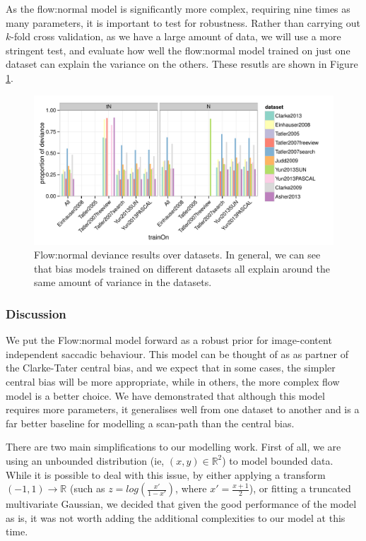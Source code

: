 \documentclass[a4paper, onecolumn, oneside, 11pt]{article}
\begin{document}
As the flow:normal model is significantly more complex, requiring nine times as many parameters, it is important to test for robustness. Rather than carrying out $k$-fold cross validation, as we have a large amount of data, we will use a more stringent test, and evaluate how well the flow:normal model trained on just one dataset can explain the variance on the others. These resutls are shown in Figure \ref{fig:nFlowDevCross}.

\begin{figure}
\centering
 \includegraphics[width=12cm]{../scripts/flow/figs/llh_crossDataset.pdf}
\caption{Flow:normal deviance results over datasets. In general, we can see that bias models trained on different datasets all explain around the same amount of variance in the datasets.}
\label{fig:nFlowDevCross}
\end{figure}

\subsubsection{Discussion}

We put the Flow:normal model forward as a robust prior for image-content independent saccadic behaviour. This model can be thought of as as partner of the Clarke-Tater central bias, and we expect that in some cases, the simpler central bias will be more appropriate, while in others, the more complex flow model is a better choice. We have demonstrated that although this model requires more parameters, it generalises well from one dataset to another and is a far better baseline for modelling a scan-path than the central bias.

There are two main simplifications to our modelling work. First of all, we are using an unbounded distribution (ie, $(x,y)\in \mathbb{R}^2$) to model bounded data. While it is possible to deal with this issue, by either applying a transform $(-1,1)\rightarrow \mathbb{R}$ (such as $z=log(\frac{x'}{1-x'})$, where $x'=\frac{x+1}{2}$), or fitting a truncated multivariate Gaussian, we decided that given the good performance of the model as is, it was not worth adding the additional complexities to our model at this time. 
\end{document}
